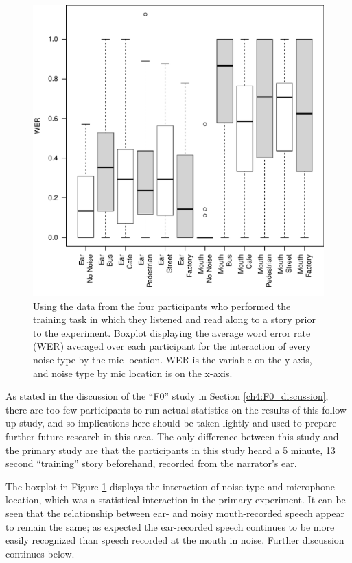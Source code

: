 \documentclass[dissertation,copyright]{uathesis}
\makeatletter
\def\maxwidth{ %
  \ifdim\Gin@nat@width>\linewidth
    \linewidth
  \else
    \Gin@nat@width
  \fi
}
\makeatother
\begin{document}
\begin{figure}[h!]

\includegraphics[width=\maxwidth]{figure/perc_boxplot_noiseXmic-1} 

\caption{Using the data from the four participants who performed the training task in which they listened and read along to a story prior to the experiment. Boxplot displaying the average word error rate (WER) averaged over each participant for the interaction of every noise type by the mic location. WER is the variable on the y-axis, and noise type by mic location is on the x-axis.}
\label{fig:perc_noiseXmic_boxplot}
\end{figure}

As stated in the discussion of the ``F0'' study in Section \ref{ch4:F0_discussion}, there are too few participants to run actual statistics on the results of this follow up study, and so implications here should be taken lightly and used to prepare further future research in this area. The only difference between this study and the primary study are that the participants in this study heard a 5 minute, 13 second ``training'' story beforehand, recorded from the narrator's ear.

The boxplot in Figure \ref{fig:perc_noiseXmic_boxplot} displays the interaction of noise type and microphone location, which was a statistical interaction in the primary experiment.  It can be seen that the relationship between ear- and noisy mouth-recorded speech appear to remain the same; as expected the ear-recorded speech continues to be more easily recognized than speech recorded at the mouth in noise.  Further discussion continues below.
\end{document}

